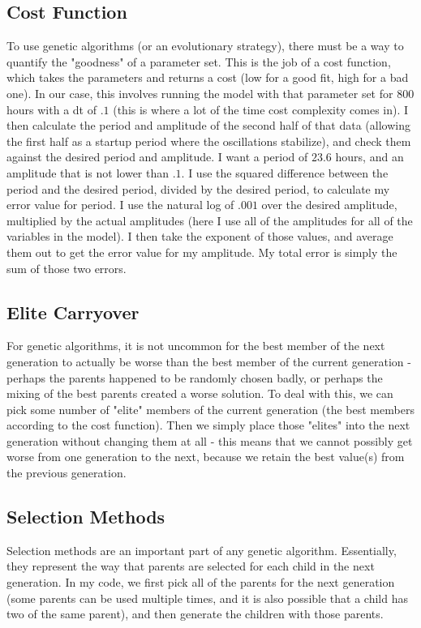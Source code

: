 \documentclass[]{article}
\begin{document}
	\subsection{Cost Function}
	To use genetic algorithms (or an evolutionary strategy), there must be a way to quantify the "goodness" of a parameter set. This is the job of a cost function, which takes the parameters and returns a cost (low for a good fit, high for a bad one). In our case, this involves running the model with that parameter set for $800$ hours with a dt of $.1$ (this is where a lot of the time cost complexity comes in). I then calculate the period and amplitude of the second half of that data (allowing the first half as a startup period where the oscillations stabilize), and check them against the desired period and amplitude. I want a period of $23.6$ hours, and an amplitude that is not lower than $.1$. I use the squared difference between the period and the desired period, divided by the desired period, to calculate my error value for period. I use the natural log of $.001$ over the desired amplitude, multiplied by the actual amplitudes (here I use all of the amplitudes for all of the variables in the model). I then take the exponent of those values, and average them out to get the error value for my amplitude. My total error is simply the sum of those two errors. \\
	
	\subsection{Elite Carryover}
	For genetic algorithms, it is not uncommon for the best member of the next generation to actually be worse than the best member of the current generation - perhaps the parents happened to be randomly chosen badly, or perhaps the mixing of the best parents created a worse solution. To deal with this, we can pick some number of "elite" members of the current generation (the best members according to the cost function). Then we simply place those "elites" into the next generation without changing them at all - this means that we cannot possibly get worse from one generation to the next, because we retain the best value(s) from the previous generation. \\
	
	\subsection{Selection Methods}
	Selection methods are an important part of any genetic algorithm. Essentially, they represent the way that parents are selected for each child in the next generation. In my code, we first pick all of the parents for the next generation (some parents can be used multiple times, and it is also possible that a child has two of the same parent), and then generate the children with those parents. \\
	
\end{document}
